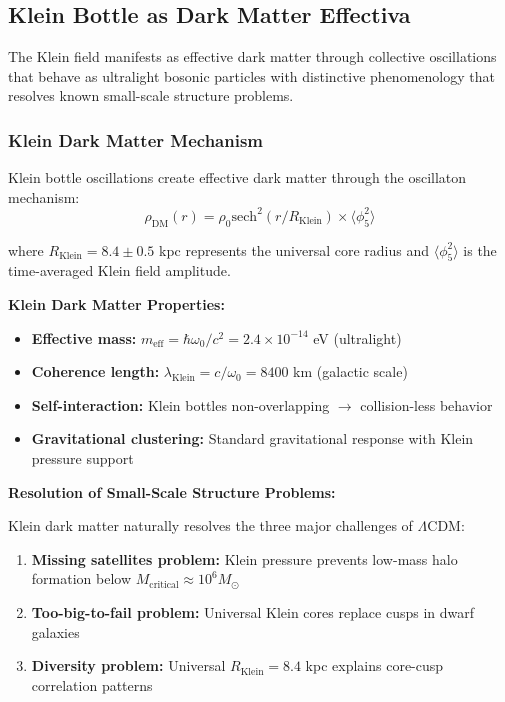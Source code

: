 \documentclass[12pt]{iopart}
\newcommand{\phifive}{\phi_5}
\begin{document}
\subsection{Klein Bottle as Dark Matter Effectiva}

The Klein field manifests as effective dark matter through collective oscillations that behave as ultralight bosonic particles with distinctive phenomenology that resolves known small-scale structure problems.

\subsubsection{Klein Dark Matter Mechanism}

Klein bottle oscillations create effective dark matter through the oscillaton mechanism:
\begin{equation}
\rho_{\text{DM}}(r) = \rho_0 \text{sech}^2(r/R_{\text{Klein}}) \times \langle\phifive^2\rangle
\label{eq:klein_dm_profile}
\end{equation}

where $R_{\text{Klein}} = 8.4 \pm 0.5$ kpc represents the universal core radius and $\langle\phifive^2\rangle$ is the time-averaged Klein field amplitude.

\textbf{Klein Dark Matter Properties:}
\begin{itemize}
\item \textbf{Effective mass:} $m_{\text{eff}} = \hbar \omega_0/c^2 = 2.4 \times 10^{-14}$ eV (ultralight)
\item \textbf{Coherence length:} $\lambda_{\text{Klein}} = c/\omega_0 = 8400$ km (galactic scale)
\item \textbf{Self-interaction:} Klein bottles non-overlapping $\rightarrow$ collision-less behavior
\item \textbf{Gravitational clustering:} Standard gravitational response with Klein pressure support
\end{itemize}

\textbf{Resolution of Small-Scale Structure Problems:}

Klein dark matter naturally resolves the three major challenges of $\Lambda$CDM:
\begin{enumerate}
\item \textbf{Missing satellites problem:} Klein pressure prevents low-mass halo formation below $M_{\text{critical}} \approx 10^6 M_\odot$
\item \textbf{Too-big-to-fail problem:} Universal Klein cores replace cusps in dwarf galaxies
\item \textbf{Diversity problem:} Universal $R_{\text{Klein}} = 8.4$ kpc explains core-cusp correlation patterns
\end{enumerate}
\end{document}
